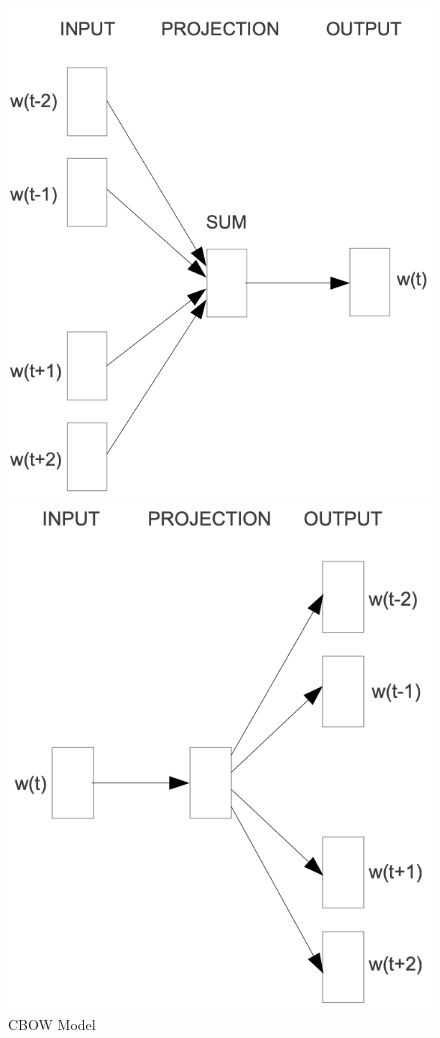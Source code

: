 \documentclass[english,version-2020-11]{uzl-thesis}
\begin{document}
\begin{figure}[h]
    \centering
    \begin{subcaptionblock}{0.45\textwidth}
        \includegraphics[width=\linewidth]{cbow.png}
        \caption{CBOW Model}
    \end{subcaptionblock}
    \hfill
    \begin{subcaptionblock}{0.45\textwidth}
        \includegraphics[width=\linewidth]{skip_gram.png}

\end{subcaptionblock}
\end{figure}
\end{document}
